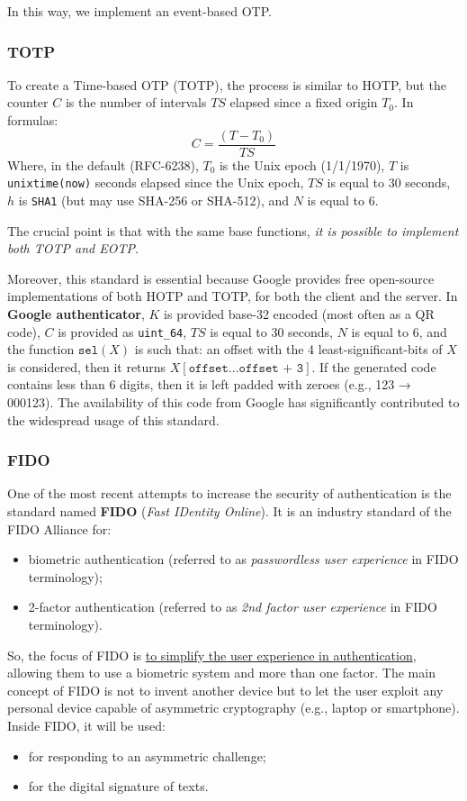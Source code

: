 In this way, we implement an event-based OTP.


\subsubsection{TOTP}
To create a Time-based OTP (TOTP), the process is similar to HOTP, but the counter \(C\) is the number of intervals \(TS\) elapsed since a fixed origin \(T_0\). In formulas:
\[ C = \frac{(T - T_0)}{TS} \]
Where, in the default (RFC-6238), \(T_0\) is the Unix epoch (1/1/1970), \(T\) is \texttt{unixtime(now)} seconds elapsed since the Unix epoch, \(TS\) is equal to 30 seconds, \(h\) is \texttt{SHA1} (but may use SHA-256 or SHA-512), and \(N\) is equal to 6.

The crucial point is that with the same base functions, \textit{it is possible to implement both TOTP and EOTP}.

Moreover, this standard is essential because Google provides free open-source implementations of both HOTP and TOTP, for both the client and the server. In \textbf{Google authenticator}, \(K\) is provided base-32 encoded (most often as a QR code), \(C\) is provided as \texttt{uint\_64}, \(TS\) is equal to 30 seconds, \(N\) is equal to 6, and the function \(\texttt{sel}(X)\) is such that: an offset with the 4 least-significant-bits of \(X\) is considered, then it returns \(X[\texttt{offset}...\texttt{offset + 3}]\). If the generated code contains less than 6 digits, then it is left padded with zeroes (e.g., 123 → 000123).
The availability of this code from Google has significantly contributed to the widespread usage of this standard.


\subsubsection{FIDO}
One of the most recent attempts to increase the security of authentication is the standard named \textbf{FIDO} (\textit{Fast IDentity Online}). It is an industry standard of the FIDO Alliance for:
\begin{itemize}
  \item biometric authentication (referred to as \textit{passwordless user experience} in FIDO terminology);
  \item 2-factor authentication (referred to as \textit{2nd factor user experience} in FIDO terminology).
\end{itemize}

So, the focus of FIDO is \ul{to simplify the user experience in authentication}, allowing them to use a biometric system and more than one factor. The main concept of FIDO is not to invent another device but to let the user exploit any personal device capable of asymmetric cryptography (e.g., laptop or smartphone). Inside FIDO, it will be used:
\begin{itemize}
  \item for responding to an asymmetric challenge;
  \item for the digital signature of texts.
\end{itemize}

